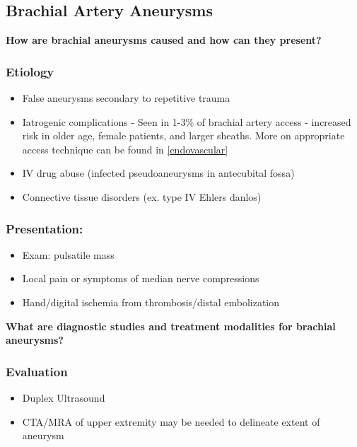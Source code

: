 \documentclass[
]{book}
\begin{document}
\hypertarget{brachial-artery-aneurysms}{%
\subsection{Brachial Artery Aneurysms}\label{brachial-artery-aneurysms}}

\textbf{How are brachial aneurysms caused and how can they present?}

\hypertarget{etiology-2}{%
\subsubsection{Etiology}\label{etiology-2}}

\begin{itemize}
\item
  False aneurysms secondary to repetitive trauma
\item
  Iatrogenic complications - Seen in 1-3\% of brachial artery access -
  increased risk in older age, female patients, and larger
  sheaths.\citep{treitl2015} More on appropriate access technique can be
  found in \ref{endovascular}
\item
  IV drug abuse (infected pseudoaneurysms in antecubital fossa)
\item
  Connective tissue disorders (ex. type IV Ehlers danlos)
\end{itemize}

\hypertarget{presentation-2}{%
\subsubsection{Presentation:}\label{presentation-2}}

\begin{itemize}
\item
  Exam: pulsatile mass
\item
  Local pain or symptoms of median nerve compressions
\item
  Hand/digital ischemia from thrombosis/distal embolization
\end{itemize}

\textbf{What are diagnostic studies and treatment modalities for brachial
aneurysms?}

\hypertarget{evaluation-3}{%
\subsubsection{Evaluation}\label{evaluation-3}}

\begin{itemize}
\item
  Duplex Ultrasound
\item
  CTA/MRA of upper extremity may be needed to delineate extent of
  aneurysm
\end{itemize}
\end{document}
